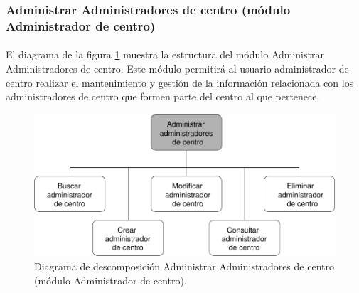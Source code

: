\subsubsection{Administrar Administradores de centro (módulo Administrador de centro)}

  \paragraph{}El diagrama de la figura
  \ref{diagramaDescomposicionAdministrarAdministradoresCentro-admCentro} muestra
  la estructura del módulo Administrar Administradores de centro. Este módulo
  permitirá al usuario administrador de centro realizar el mantenimiento y
  gestión de la información relacionada con los administradores de centro que
  formen parte del centro al que pertenece.

  \begin{figure}[!ht]
    \begin{center}
      \includegraphics[]{11.Disenyo_Arquitectonico/11.2.Diagramas_Descomposicion/11.2.3.Modulo_administrador_centro/AdministrarBBDD/AdministrarUsuarios/AdministrarAdministradoresCentro/Diagramas/administrar_administradores_centro.pdf}
      \caption{Diagrama de descomposición Administrar Administradores de centro (módulo Administrador de centro).}
      \label{diagramaDescomposicionAdministrarAdministradoresCentro-admCentro}
    \end{center}
  \end{figure}
